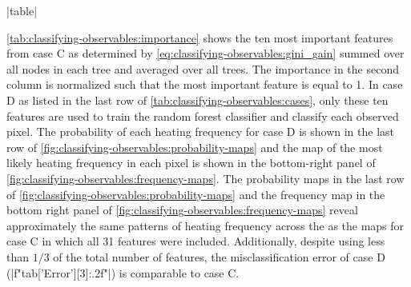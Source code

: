 |table|

\autoref{tab:classifying-observables:importance} shows the ten most important features from case C as determined by \autoref{eq:classifying-observables:gini_gain} summed over all nodes in each tree and averaged over all trees. The importance in the second column is normalized such that the most important feature is equal to 1. In case D as listed in the last row of \autoref{tab:classifying-observables:cases}, only these ten features are used to train the random forest classifier and classify each observed pixel. The probability of each heating frequency for case D is shown in the last row of \autoref{fig:classifying-observables:probability-maps} and the map of the most likely heating frequency in each pixel is shown in the bottom-right panel of \autoref{fig:classifying-observables:frequency-maps}. The probability maps in the last row of \autoref{fig:classifying-observables:probability-maps} and the frequency map in the bottom right panel of \autoref{fig:classifying-observables:frequency-maps} reveal approximately the same patterns of heating frequency across the \AR{} as the maps for case C in which all 31 features were included. Additionally, despite using less than $1/3$ of the total number of features, the misclassification error of case D (|f"{tab['Error'][3]:.2f}"|) is comparable to case C.

